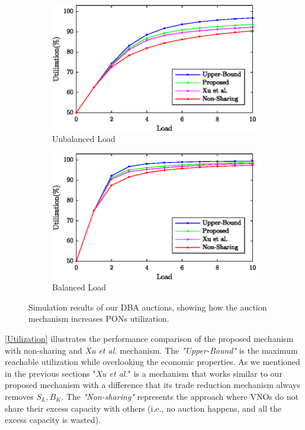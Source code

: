 \begin{figure}[h]
\centering
\begin{subfigure}{0.7\columnwidth}
\includegraphics[width=\columnwidth]{Figures/fig1b}%
\caption{Unbalanced Load}%
\label{Unbalanced_Utilization}%
\end{subfigure}\hfill%
\begin{subfigure}{0.7\columnwidth}
\includegraphics[width=\columnwidth]{Figures/fig1a}%
\caption{Balanced Load}%
\label{Balanced_Utilization}%
\end{subfigure}\hfill%
\caption{Simulation results of our \ac{DBA} auctions, showing how the auction mechanism increases \acp{PON} utilization.}
\label{Utilization}%
\end{figure}

\autoref{Utilization} illustrates the performance comparison of the proposed mechanism with non-sharing and \textit{Xu et al.} \cite{5462277} mechanism. The \textit{"Upper-Bound"} is the maximum reachable utilization while overlooking the economic properties. As we mentioned in the previous sections "\textit{Xu et al.}" is a mechanism that works similar to our proposed mechanism with a difference that its trade reduction mechanism always removes $S_L , B_K$. The \textit{"Non-sharing"} represents the approach where \acp{VNO} do not share their excess capacity with others (i.e., no auction happens, and all the excess capacity is wasted).

